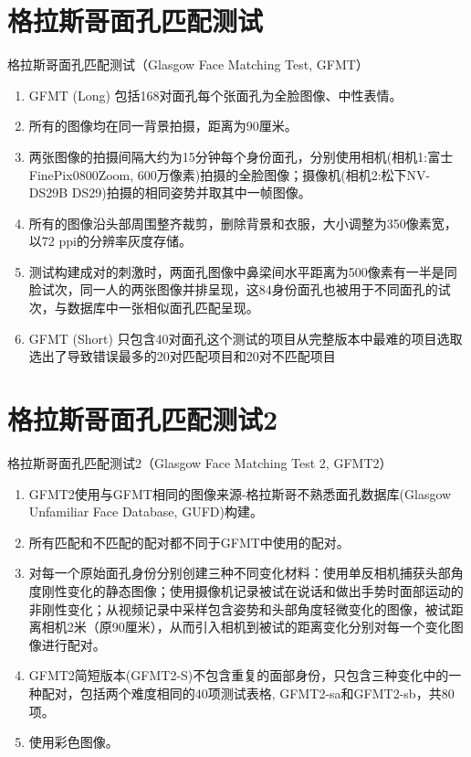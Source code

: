 \documentclass[]{ctexbook}
\providecommand{\tightlist}{%
  \setlength{\itemsep}{0pt}\setlength{\parskip}{0pt}}
\theoremstyle{definition}
\theoremstyle{definition}
\theoremstyle{definition}
\theoremstyle{definition}
\theoremstyle{remark}
\begin{document}
\section{格拉斯哥面孔匹配测试}\label{ux683cux62c9ux65afux54e5ux9762ux5b54ux5339ux914dux6d4bux8bd5}

格拉斯哥面孔匹配测试（Glasgow Face Matching Test, GFMT）

\begin{enumerate}
\def\labelenumi{\arabic{enumi}.}
\tightlist
\item
  GFMT (Long) 包括168对面孔每个张面孔为全脸图像、中性表情。
\item
  所有的图像均在同一背景拍摄，距离为90厘米。\\
\item
  两张图像的拍摄间隔大约为15分钟每个身份面孔，分别使用相机(相机1:富士FinePix0800Zoom, 600万像素)拍摄的全脸图像；摄像机(相机2:松下NV-DS29B DS29)拍摄的相同姿势并取其中一帧图像。\\
\item
  所有的图像沿头部周围整齐裁剪，删除背景和衣服，大小调整为350像素宽，以72 ppi的分辨率灰度存储。\\
\item
  测试构建成对的刺激时，两面孔图像中鼻梁间水平距离为500像素有一半是同脸试次，同一人的两张图像并排呈现，这84身份面孔也被用于不同面孔的试次，与数据库中一张相似面孔匹配呈现。\\
\item
  GFMT (Short) 只包含40对面孔这个测试的项目从完整版本中最难的项目选取选出了导致错误最多的20对匹配项目和20对不匹配项目
\end{enumerate}

\section{格拉斯哥面孔匹配测试2}\label{ux683cux62c9ux65afux54e5ux9762ux5b54ux5339ux914dux6d4bux8bd52}

格拉斯哥面孔匹配测试2（Glasgow Face Matching Test 2, GFMT2）

\begin{enumerate}
\def\labelenumi{\arabic{enumi}.}
\tightlist
\item
  GFMT2使用与GFMT相同的图像来源-格拉斯哥不熟悉面孔数据库(Glasgow Unfamiliar Face Database, GUFD)构建。\\
\item
  所有匹配和不匹配的配对都不同于GFMT中使用的配对。\\
\item
  对每一个原始面孔身份分别创建三种不同变化材料：使用单反相机捕获头部角度刚性变化的静态图像；使用摄像机记录被试在说话和做出手势时面部运动的非刚性变化；从视频记录中采样包含姿势和头部角度轻微变化的图像，被试距离相机2米（原90厘米），从而引入相机到被试的距离变化分别对每一个变化图像进行配对。\\
\item
  GFMT2简短版本(GFMT2-S)不包含重复的面部身份，只包含三种变化中的一种配对，包括两个难度相同的40项测试表格, GFMT2-sa和GFMT2-sb，共80项。\\
\item
  使用彩色图像。
\end{enumerate}
\end{document}
